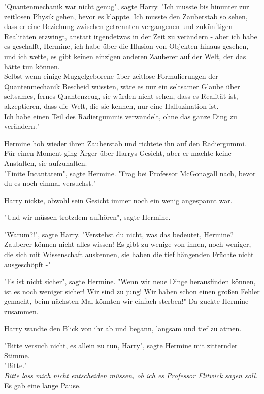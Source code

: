 {"Quantenmechanik war nicht genug", sagte Harry. "Ich musste bis hinunter zur zeitlosen Physik gehen, bevor es klappte. Ich musste den Zauberstab so sehen, dass er eine Beziehung zwischen getrennten vergangenen und zukünftigen Realitäten erzwingt, anstatt irgendetwas in der Zeit zu verändern - aber ich habe es geschafft, Hermine, ich habe über die Illusion von Objekten hinaus gesehen, und ich wette, es gibt keinen einzigen anderen Zauberer auf der Welt, der das hätte tun können.\\ Selbst wenn einige Muggelgeborene über zeitlose Formulierungen der Quantenmechanik Bescheid wüssten, wäre es nur ein seltsamer Glaube über seltsames, fernes Quantenzeug, sie würden nicht sehen, dass es Realität ist, akzeptieren, dass die Welt, die sie kennen, nur eine Halluzination ist.\\ Ich habe einen Teil des Radiergummis verwandelt, ohne das ganze Ding zu verändern."

Hermine hob wieder ihren Zauberstab und richtete ihn auf den Radiergummi.\\ Für einen Moment ging Ärger über Harrys Gesicht, aber er machte keine Anstalten, sie aufzuhalten.\\ "Finite Incantatem", sagte Hermine. "Frag bei Professor McGonagall nach, bevor du es noch einmal versuchst."

Harry nickte, obwohl sein Gesicht immer noch ein wenig angespannt war.

"Und wir müssen trotzdem aufhören", sagte Hermine.

"Warum?!", sagte Harry. "Verstehst du nicht, was das bedeutet, Hermine? Zauberer können nicht alles wissen! Es gibt zu wenige von ihnen, noch weniger, die sich mit Wissenschaft auskennen, sie haben die tief hängenden Früchte nicht ausgeschöpft -"

"Es ist nicht sicher", sagte Hermine. "Wenn wir neue Dinge herausfinden können, ist es noch weniger sicher! Wir sind zu jung! Wir haben schon einen großen Fehler gemacht, beim nächsten Mal könnten wir einfach sterben!" Da zuckte Hermine zusammen.

Harry wandte den Blick von ihr ab und begann, langsam und tief zu atmen.

"Bitte versuch nicht, es allein zu tun, Harry", sagte Hermine mit zitternder Stimme.\\ "Bitte."\\ \emph{Bitte lass mich nicht entscheiden müssen, ob ich es Professor Flitwick sagen soll}.\\ Es gab eine lange Pause.

}
